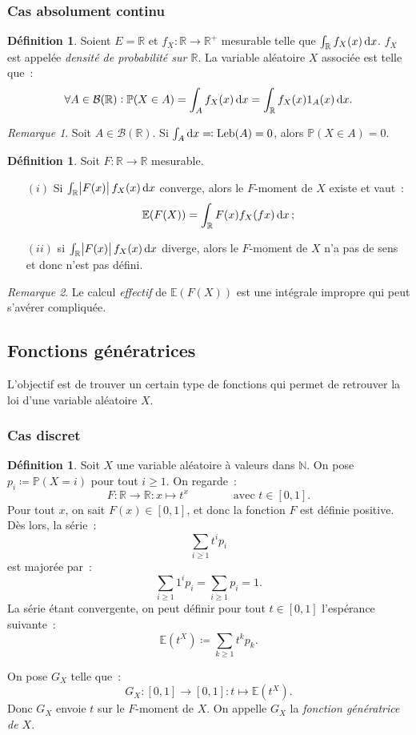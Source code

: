 \documentclass{article}
\newcommand{\E}{\mathbb E}
\newcommand{\N}{\mathbb N}
\renewcommand{\P}{\mathbb P}
\newcommand{\R}{\mathbb R}
\DeclareMathOperator{\Leb}{Leb}
\theoremstyle{definition}
\newtheorem{déf}[thm]{Définition}
\theoremstyle{remark}
\newtheorem*{rmq}{Remarque}
\begin{document}
		\subsubsection{Cas absolument continu}
		\begin{déf} Soient $E = \R$ et $f_X : \R \to \R^+$ mesurable telle que $\int_\R f_X(x)\dif x$. $f_X$ est appelée \emph{densité de probabilité sur $\R$}.
		La variable aléatoire $X$ associée est telle que~:
		\[\forall A \in \mathcal B(\R) : \P(X \in A) = \int_A f_X(x)\dif x = \int_\R f_X(x)1_A(x)\dif x.\]
		\end{déf}

		\begin{rmq} Soit $A \in \mathcal B(\R)$. Si $\int_A\dif x \eqqcolon \Leb(A) = 0$, alors $\P(X \in A) = 0$. \end{rmq}

		\begin{déf} Soit $F : \R \to \R$ mesurable.

		\begin{itemize}
			\item[$(i)$] Si $\int_\R \abs{F(x)}f_X(x)\dif x$ converge, alors le $F$-moment de $X$ existe et vaut~:
			             \[\E(F(X)) = \int_\R F(x)f_X(fx)\dif x\,;\]
			\item[$(ii)$] si $\int_\R \abs{F(x)}f_X(x)\dif x$ diverge, alors le $F$-moment de $X$ n'a pas de sens et donc n'est pas défini.
		\end{itemize}
		\end{déf}

		\begin{rmq} Le calcul \emph{effectif} de $\E(F(X))$ est une intégrale impropre qui peut s'avérer compliquée. \end{rmq}
	
	\subsection{Fonctions génératrices}
		L'objectif est de trouver un certain type de fonctions qui permet de retrouver la loi d'une variable aléatoire $X$.

		\subsubsection{Cas discret}
		\begin{déf} Soit $X$ une variable aléatoire à valeurs dans $\N$. On pose $p_i \coloneqq \P(X = i)$ pour tout $i \geq 1$.
		On regarde~:
		\[F : \R \to \R : x \mapsto t^x\qquad\qquad\text{avec }t \in [0, 1].\]
		Pour tout $x$, on sait $F(x) \in [0, 1]$, et donc la fonction $F$ est définie positive. Dès lors, la série~:
		\[\sum_{i \geq 1}t^ip_i\]
		est majorée par~:
		\[\sum_{i \geq 1}1^ip_i = \sum_{i \geq 1}p_i = 1.\]
		La série étant convergente, on peut définir pour tout $t \in [0, 1]$ l'espérance suivante~:
		\[\E(t^X) \coloneqq \sum_{k \geq 1}t^kp_k.\]

		On pose $G_X$ telle que~:
		\[G_X : [0, 1] \to [0, 1] : t \mapsto \E(t^X).\]
		Donc $G_X$ envoie $t$ sur le $F$-moment de $X$. On appelle $G_X$ la \emph{fonction génératrice de $X$}.
		\end{déf}
\end{document}
